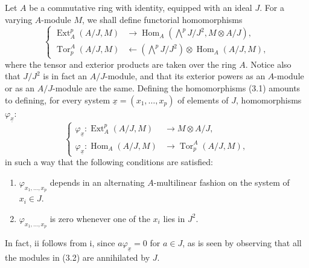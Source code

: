 Let $A$ be a commutative ring with identity, equipped with an ideal $J$. For a
varying $A$-module $M$, we shall define functorial homomorphisms
\begin{equation}\tag{3.1}
\left\{
\begin{aligned}
\operatorname{Ext}_{A}^{p}(A/J,M)
  &\longrightarrow
  \operatorname{Hom}_{A}\!\left(\bigwedge^{p}J/J^{2},M\otimes A/J\right),\\
\operatorname{Tor}_{p}^{A}(A/J,M)
  &\longleftarrow
  \left(\bigwedge^{p}J/J^{2}\right)
  \otimes\operatorname{Hom}_{A}(A/J,M),
\end{aligned}
\right.
\end{equation}
where the tensor and exterior products are taken over the ring $A$. Notice also
that $J/J^{2}$ is in fact an $A/J$-module, and that its exterior powers as an
$A$-module or as an $A/J$-module are the same. Defining the homomorphisms (3.1)
amounts to defining, for every system
$\underline{x}=(x_1,\ldots,x_p)$ of elements of $J$, homomorphisms
$\varphi_{\underline{x}}$:
\begin{equation}\tag{3.2}
\left\{
\begin{aligned}
\varphi_{\underline{x}}:
  \operatorname{Ext}_{A}^{p}(A/J,M)&\longrightarrow M\otimes A/J,\\
\varphi_{\underline{x}}:
  \operatorname{Hom}_{A}(A/J,M)&\longrightarrow
  \operatorname{Tor}_{p}^{A}(A/J,M),
\end{aligned}
\right.
\end{equation}
in such a way that the following conditions are satisfied:

\begin{enumerate}
\item[\textup{i.}] $\varphi_{x_1,\ldots,x_p}$ depends in an alternating
$A$-multilinear fashion on the system of $x_i\in J$.
\item[\textup{ii.}] $\varphi_{x_1,\ldots,x_p}$ is zero whenever one of the
$x_i$ lies in $J^{2}$.
\end{enumerate}
In fact, ii follows from i, since $a\varphi_{\underline{x}}=0$ for $a\in J$, as
is seen by observing that all the modules in (3.2) are annihilated by $J$.

